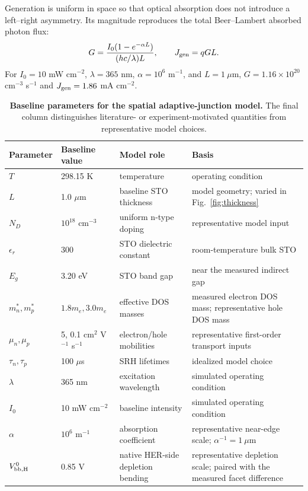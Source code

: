 \documentclass[11pt]{article}
\begin{document}
Generation is uniform in space so that optical absorption does not introduce a left--right asymmetry. Its magnitude reproduces the total Beer--Lambert absorbed photon flux:
\begin{equation}
G=\frac{I_0(1-e^{-\alpha L})}{(hc/\lambda)L},\qquad
J_{\rm gen}=qGL.
\label{eq:generation}
\end{equation}
For $I_0=10$ mW cm$^{-2}$, $\lambda=365$ nm, $\alpha=10^6$ m$^{-1}$, and $L=1~\mu$m, $G=1.16\times10^{20}$ cm$^{-3}$ s$^{-1}$ and $J_{\rm gen}=1.86$ mA cm$^{-2}$.

\begin{table}[p]
\centering
\caption{\textbf{Baseline parameters for the spatial adaptive-junction model.} The final column distinguishes literature- or experiment-motivated quantities from representative model choices.}
\label{tab:modelparams}
\scriptsize
\begin{tabular}{@{}p{}p{}p{}p{}@{}}
\toprule
Parameter & Baseline value & Model role & Basis \\
\midrule
$T$ & 298.15 K & temperature & operating condition \\
$L$ & 1.0 $\mu$m & baseline STO thickness & model geometry; varied in Fig.~\ref{fig:thickness} \\
$N_D$ & $10^{18}$ cm$^{-3}$ & uniform n-type doping & representative model input \\
$\epsilon_r$ & 300 & STO dielectric constant & room-temperature bulk STO\cite{neville1972} \\
$E_g$ & 3.20 eV & STO band gap & near the measured indirect gap\cite{vanbenthem2001} \\
$m_n^*,m_p^*$ & $1.8m_e,3.0m_e$ & effective DOS masses & measured electron DOS mass;\cite{ahrens2007} representative hole DOS mass \\
$\mu_n,\mu_p$ & 5, 0.1 cm$^2$ V$^{-1}$ s$^{-1}$ & electron/hole mobilities & representative first-order transport inputs \\
$\tau_n,\tau_p$ & 100 $\mu$s & SRH lifetimes & idealized model choice \\
$\lambda$ & 365 nm & excitation wavelength & simulated operating condition \\
$I_0$ & 10 mW cm$^{-2}$ & baseline intensity & simulated operating condition \\
$\alpha$ & $10^6$ m$^{-1}$ & absorption coefficient & representative near-edge scale; $\alpha^{-1}=1~\mu$m\cite{cohen1968} \\
$V_{\rm bb,H}^0$ & 0.85 V & native HER-side depletion bending & representative depletion scale; paired with the measured facet difference\cite{assavachin2024} \\

\end{tabular}
\end{table}
\end{document}
